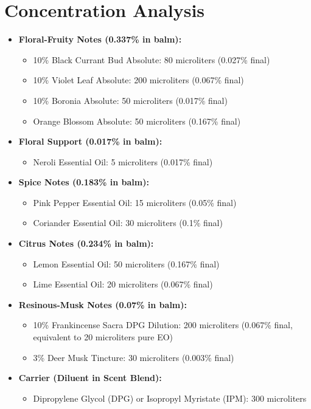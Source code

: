 \documentclass{article}
\begin{document}
\vspace{0.5cm}

\section*{Concentration Analysis}
\begin{itemize}[leftmargin=*]
  \item \textcolor{colaRed}{\textbf{Floral-Fruity Notes (0.337\% in balm):}}
  \begin{itemize}
    \item 10\% Black Currant Bud Absolute: 80 microliters (0.027\% final)
    \item 10\% Violet Leaf Absolute: 200 microliters (0.067\% final)
    \item 10\% Boronia Absolute: 50 microliters (0.017\% final)
    \item Orange Blossom Absolute: 50 microliters (0.167\% final)
  \end{itemize}
  
  \item \textcolor{colaRed}{\textbf{Floral Support (0.017\% in balm):}}
  \begin{itemize}
    \item Neroli Essential Oil: 5 microliters (0.017\% final)
  \end{itemize}
  
  \item \textcolor{colaRed}{\textbf{Spice Notes (0.183\% in balm):}}
  \begin{itemize}
    \item Pink Pepper Essential Oil: 15 microliters (0.05\% final)
    \item Coriander Essential Oil: 30 microliters (0.1\% final)
  \end{itemize}
  
  \item \textcolor{violetPurple}{\textbf{Citrus Notes (0.234\% in balm):}}
  \begin{itemize}
    \item Lemon Essential Oil: 50 microliters (0.167\% final)
    \item Lime Essential Oil: 20 microliters (0.067\% final)
  \end{itemize}
  
  \item \textcolor{violetPurple}{\textbf{Resinous-Musk Notes (0.07\% in balm):}}
  \begin{itemize}
    \item 10\% Frankincense Sacra DPG Dilution: 200 microliters (0.067\% final, equivalent to 20 microliters pure EO)
    \item 3\% Deer Musk Tincture: 30 microliters (0.003\% final)
  \end{itemize}
  
  \item \textcolor{colaBrown}{\textbf{Carrier (Diluent in Scent Blend):}}
  \begin{itemize}
    \item Dipropylene Glycol (DPG) or Isopropyl Myristate (IPM): 300 microliters
  \end{itemize}
\end{itemize}
\end{document}
